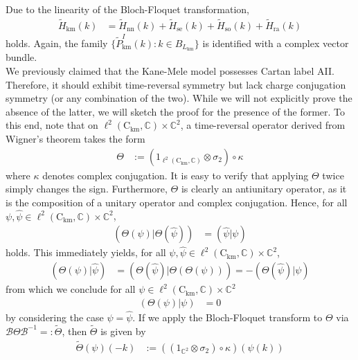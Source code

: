 Due to the linearity of the Bloch-Floquet transformation,
\begin{align*}
  \tilde{H}_{\textrm{km}}(k)
  &=
  \tilde{H}_{\textrm{nn}}(k)
  +
  \tilde{H}_{\textrm{se}}(k)
  +
  \tilde{H}_{\textrm{so}}(k)
  +
  \tilde{H}_{\textrm{ra}}(k)
\end{align*}  
holds.
Again, the family $\lbrace \tilde{P}_{\textrm{km}}^{I}(k) \colon k \in B_{L_{\textrm{km}}} \rbrace$ is identified with a complex vector bundle.
\\
We previously claimed that the Kane-Mele model possesses Cartan label AII.
Therefore, it should exhibit time-reversal symmetry but lack charge conjugation symmetry (or any combination of the two).
While we will not explicitly prove the absence of the latter, we will sketch the proof for the presence of the former.
To this end, note that on $\ell^{2}(\mathrm{C}_{\textrm{km}},\mathbb{C}) \times \mathbb{C}^{2}$, a time-reversal operator derived from Wigner's theorem takes the form
\begin{align*}
  \Theta
  &:=
  \left(
    1_{\ell^{2}(\mathrm{C}_{\textrm{km}},\mathbb{C})}
    \otimes
    \sigma_{2}
  \right)
  \circ
  \kappa
\end{align*}
where $\kappa$ denotes complex conjugation.
It is easy to verify that applying $\Theta$ twice simply changes the sign.
Furthermore, $\Theta$ is clearly an antiunitary operator, as it is the composition of a unitary operator and complex conjugation.
Hence, for all $\psi,\hat{\psi} \in \ell^{2}(\mathrm{C}_{\textrm{km}},\mathbb{C}) \times \mathbb{C}^{2}$,
\begin{align*}
  (\Theta(\psi) \vert \Theta(\hat{\psi}))
  &=
(\hat{\psi} \vert \psi)\end{align*}
holds.
This immediately yields, for all $\psi,\hat{\psi} \in \ell^{2}(\mathrm{C}_{\textrm{km}},\mathbb{C}) \times \mathbb{C}^{2}$,
\begin{align*}
  (\Theta(\psi) \vert \hat{\psi})
  &=
  (\Theta(\hat{\psi}) \vert \Theta(\Theta(\psi)))
  =
  -
  (\Theta(\hat{\psi}) \vert \psi)
\end{align*}
from which we conclude for all $\psi \in \ell^{2}(\mathrm{C}_{\textrm{km}},\mathbb{C}) \times \mathbb{C}^{2}$
\begin{align*}
  (\Theta(\psi) \vert \psi)
  &=
  0
\end{align*}
by considering the case $\psi = \hat{\psi}$.
If we apply the Bloch-Floquet transform to $\Theta$ via $\mathcal{B}\Theta\mathcal{B}^{-1} =: \tilde{\Theta}$, then $\tilde{\Theta}$ is given by
\begin{align*}
  \tilde{\Theta}(\psi)(-k)
  &:=
  \left(
    \left(
      1_{\mathbb{C}^{2}}
      \otimes
      \sigma_{2}
    \right)
    \circ
    \kappa
  \right)
  (\psi(k))
\end{align*}
